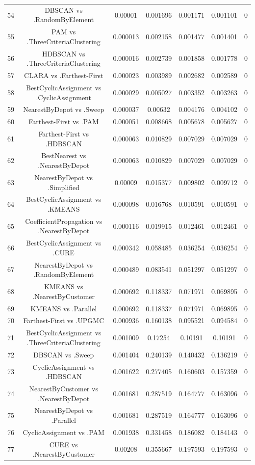 \documentclass[a4paper,10pt]{article}
\begin{document}
\begin{landscape}
\begin{table}[!htp]
\begin{tabular}{ccccccc}
54&DBSCAN vs .RandomByElement&0.00001&0.001696&0.001171&0.001101&0\\
55&PAM vs .ThreeCriteriaClustering&0.000013&0.002158&0.001477&0.001401&0\\
56&HDBSCAN vs .ThreeCriteriaClustering&0.000016&0.002739&0.001858&0.001778&0\\
57&CLARA vs .Farthest-First&0.000023&0.003989&0.002682&0.002589&0\\
58&BestCyclicAssignment vs .CyclicAssignment&0.000029&0.005027&0.003352&0.003263&0\\
59&NearestByDepot vs .Sweep&0.000037&0.00632&0.004176&0.004102&0\\
60&Farthest-First vs .PAM&0.000051&0.008668&0.005678&0.005627&0\\
61&Farthest-First vs .HDBSCAN&0.000063&0.010829&0.007029&0.007029&0\\
62&BestNearest vs .NearestByDepot&0.000063&0.010829&0.007029&0.007029&0\\
63&NearestByDepot vs .Simplified&0.00009&0.015377&0.009802&0.009712&0\\
64&BestCyclicAssignment vs .KMEANS&0.000098&0.016768&0.010591&0.010591&0\\
65&CoefficientPropagation vs .NearestByDepot&0.000116&0.019915&0.012461&0.012461&0\\
66&BestCyclicAssignment vs .CURE&0.000342&0.058485&0.036254&0.036254&0\\
67&NearestByDepot vs .RandomByElement&0.000489&0.083541&0.051297&0.051297&0\\
68&KMEANS vs .NearestByCustomer&0.000692&0.118337&0.071971&0.069895&0\\
69&KMEANS vs .Parallel&0.000692&0.118337&0.071971&0.069895&0\\
70&Farthest-First vs .UPGMC&0.000936&0.160138&0.095521&0.094584&0\\
71&BestCyclicAssignment vs .ThreeCriteriaClustering&0.001009&0.17254&0.10191&0.10191&0\\
72&DBSCAN vs .Sweep&0.001404&0.240139&0.140432&0.136219&0\\
73&CyclicAssignment vs .HDBSCAN&0.001622&0.277405&0.160603&0.157359&0\\
74&NearestByCustomer vs .NearestByDepot&0.001681&0.287519&0.164777&0.163096&0\\
75&NearestByDepot vs .Parallel&0.001681&0.287519&0.164777&0.163096&0\\
76&CyclicAssignment vs .PAM&0.001938&0.331458&0.186082&0.184143&0\\
77&CURE vs .NearestByCustomer&0.00208&0.355667&0.197593&0.197593&0\\

\end{tabular}
\end{table}
\end{landscape}
\end{document}
